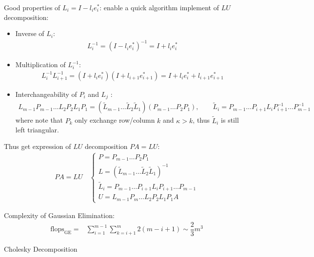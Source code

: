     Good properties of $ L_i=I-l_ie_i^* $: enable a quick algorithm implement of $ LU $ decomposition:
    \begin{itemize}[topsep=2pt,itemsep=0pt]
        \item Inverse of $ L_i $:
        \begin{align}
            L_i^{-1}=(I-l_ie_i^*)^{-1}=I+l_ie_i^* 
        \end{align}
        \item Multiplication of $ L_i^{-1} $:
        \begin{align}
            L_i ^{-1}L_{i+1}^{-1}=(I+l_ie_i^*)(I+l_{i+1}e_{i+1}^*)=I+l_ie_i^*+l_{i+1}e_{i+1}^*
        \end{align}
        \item Interchangeability of $ P_i $ and $ L_j $ :
        \begin{align}
            L_{m-1}P_{m-1}\ldots L_2P_2L_1P_1=(\tilde{L}_{m-1}\ldots\tilde{L}_2\tilde{L}_1)(P_{m-1}\ldots P_2P_1),\qquad \tilde{L}_i=P_{m-1}\ldots P_{i+1}L_iP^{-1}_{i+1}\ldots P^{-1}_{m-1}
        \end{align}        
        where note that $ P_{k} $ only exchange row/column $ k $ and $ \kappa>k $, thus $ \tilde{L}_i $ is still left triangular.
    \end{itemize}
    
    \noindent Thus get expression of $ LU $ decomposition $ PA=LU $:
    \begin{align}
         PA=LU\quad\begin{cases}
            P=P_{m-1}\ldots P_2P_1\\
            L= (\tilde{L}_{m-1}\ldots\tilde{L}_2\tilde{L}_1)^{-1}\\
            \tilde{L}_i=P_{m-1}\ldots P_{i+1}L_iP_{i+1}\ldots P_{m-1}\\
            U=L_{m-1}P_m\ldots L_2P_2L_1P_1A
         \end{cases} 
    \end{align}
    
    

    Complexity of Gaussian Elimination:
    \begin{align}
        \mathrm{flops}_\mathrm{GE}=&\sum_{i=1}^{m-1}\sum_{k=i+1}^m 2(m-i+1)\sim \dfrac{2}{3}m^3
    \end{align}
 
\begin{point}
    Cholesky Decomposition
\end{point}

